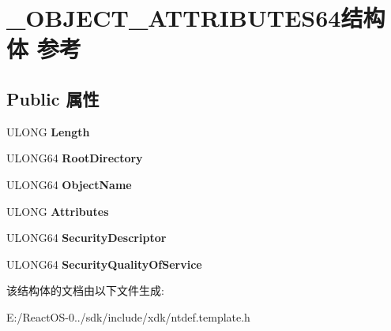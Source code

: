 \hypertarget{struct___o_b_j_e_c_t___a_t_t_r_i_b_u_t_e_s64}{}\section{\+\_\+\+O\+B\+J\+E\+C\+T\+\_\+\+A\+T\+T\+R\+I\+B\+U\+T\+E\+S64结构体 参考}
\label{struct___o_b_j_e_c_t___a_t_t_r_i_b_u_t_e_s64}
\subsection*{Public 属性}
\begin{DoxyCompactItemize}
\item 
\mbox{\label{struct___o_b_j_e_c_t___a_t_t_r_i_b_u_t_e_s64_a7eaac6b82e2c679a92547c868833184e}} 
U\+L\+O\+NG {\bfseries Length}
\item 
\mbox{\label{struct___o_b_j_e_c_t___a_t_t_r_i_b_u_t_e_s64_ab9932983757fb3a7dfd2eb3e2e2863b2}} 
U\+L\+O\+N\+G64 {\bfseries Root\+Directory}
\item 
\mbox{\label{struct___o_b_j_e_c_t___a_t_t_r_i_b_u_t_e_s64_a989dc03aae40d545bae7a8170615daf5}} 
U\+L\+O\+N\+G64 {\bfseries Object\+Name}
\item 
\mbox{\label{struct___o_b_j_e_c_t___a_t_t_r_i_b_u_t_e_s64_a948cb3039ba36087924e194f93fdc7a7}} 
U\+L\+O\+NG {\bfseries Attributes}
\item 
\mbox{\label{struct___o_b_j_e_c_t___a_t_t_r_i_b_u_t_e_s64_a98a5ee896d7c8588e18e3477ec11d509}} 
U\+L\+O\+N\+G64 {\bfseries Security\+Descriptor}
\item 
\mbox{\label{struct___o_b_j_e_c_t___a_t_t_r_i_b_u_t_e_s64_a207da681ac3f18264c1f608effc13aed}} 
U\+L\+O\+N\+G64 {\bfseries Security\+Quality\+Of\+Service}
\end{DoxyCompactItemize}


该结构体的文档由以下文件生成\+:\begin{DoxyCompactItemize}
\item 
E\+:/\+React\+O\+S-\/0../sdk/include/xdk/ntdef.\+template.\+h\end{DoxyCompactItemize}
